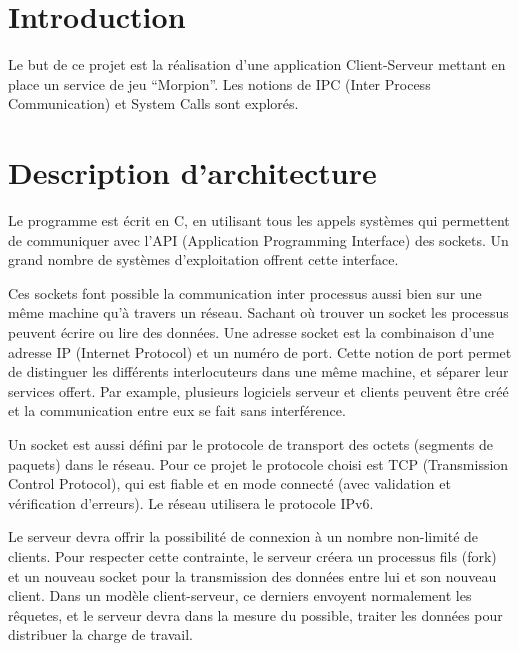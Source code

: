 \documentclass[11pt,a4paper]{article}
\begin{document}
\pagestyle{fancy}

\section{Introduction}
\label{sec:intro}

Le but de ce projet est la réalisation d'une application
Client-Serveur mettant en place un service de jeu ``Morpion''. Les
notions de IPC (Inter Process Communication) et System Calls sont
explorés.

\section{Description d'architecture}
\label{sec:des}

Le programme est écrit en C, en utilisant tous les appels systèmes qui
permettent de communiquer avec l'API (Application Programming
Interface) des sockets. Un grand nombre de systèmes d'exploitation
offrent cette interface.

\medbreak

Ces sockets font possible la communication inter processus aussi bien
sur une même machine qu'à travers un réseau. Sachant où trouver un
socket les processus peuvent écrire ou lire des données. Une adresse
socket est la combinaison d'une adresse IP (Internet Protocol) et un
numéro de port. Cette notion de port permet de distinguer les
différents interlocuteurs dans une même machine, et séparer leur
services offert. Par example, plusieurs logiciels serveur et clients
peuvent être créé et la communication entre eux se fait sans
interférence.

\medbreak

Un socket est aussi défini par le protocole de transport des octets
(segments de paquets) dans le réseau. Pour ce projet le protocole
choisi est TCP (Transmission Control Protocol), qui est fiable et en
mode connecté (avec validation et vérification d'erreurs). Le réseau
utilisera le protocole IPv6.

\medbreak

Le serveur devra offrir la possibilité de connexion à un nombre
non-limité de clients. Pour respecter cette contrainte, le serveur
créera un processus fils (fork) et un nouveau socket pour la
transmission des données entre lui et son nouveau client. Dans un
modèle client-serveur, ce derniers envoyent normalement les rêquetes,
et le serveur devra dans la mesure du possible, traiter les données
pour distribuer la charge de travail.
\end{document}
